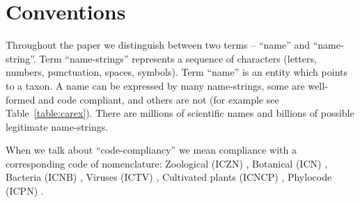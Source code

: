 \documentclass{bmcart}
\begin{document}
\begin{frontmatter}
\begin{abstractbox}
\begin{keyword}
\end{keyword}


\end{abstractbox}
%

\end{frontmatter}



\section*{Conventions}

Throughout the paper we distinguish between two terms -- ``name'' and
``name-string''. Term ``name-strings'' represents a sequence of characters
(letters, numbers, punctuation, spaces, symbols). Term ``name'' is an entity
which points to a taxon. A name can be expressed by many name-strings, some are
well-formed and code compliant, and others are not (for example see
Table~\ref{table:carex}).  There are millions of scientific names and billions
of possible legitimate name-strings.

When we talk about ``code-compliancy'' we mean compliance with a corresponding
code of nomenclature: Zoological (ICZN) \cite{ICZN}, Botanical (ICN)
\cite{ICN}, Bacteria (ICNB) \cite{ICNB}, Viruses (ICTV) \cite{ICTV}, Cultivated
plants (ICNCP) \cite{ICNCP}, Phylocode (ICPN) \cite{ICPN}.
\end{document}
